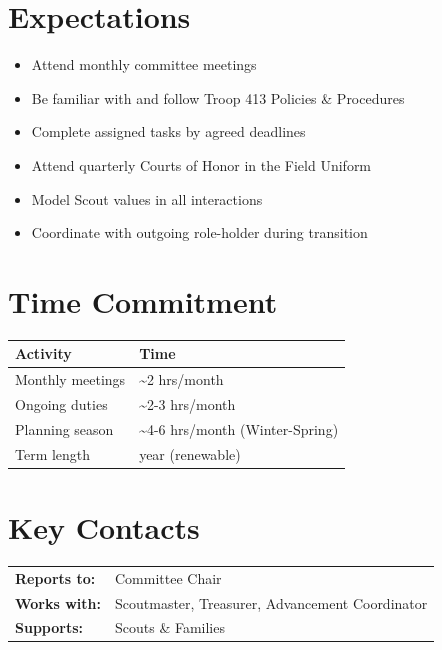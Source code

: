 \documentclass[11pt, letterpaper]{article}
\begin{document}
\hfill
\begin{minipage}[t]{0.48\linewidth}
\raggedright

\section{Expectations}
\begin{itemize}
  \item Attend monthly committee meetings
  \item Be familiar with and follow Troop 413 Policies \& Procedures
  \item Complete assigned tasks by agreed deadlines
  \item Attend quarterly Courts of Honor in the Field Uniform
  \item Model Scout values in all interactions
  \item Coordinate with outgoing role-holder during transition
\end{itemize}

\section{Time Commitment}
\begin{tabular}{@{}p{3.0cm} >{\raggedright\arraybackslash}p{3.8cm}@{}}
  \toprule
  \textbf{Activity} & \textbf{Time} \\
  \midrule
  Monthly meetings  & \textasciitilde{}2 hrs/month \\
  Ongoing duties    & \textasciitilde{}2-3 hrs/month \\
  Planning season   & \textasciitilde{}4-6 hrs/month (Winter-Spring) \\
  Term length       & 1 year (renewable) \\
  \bottomrule
\end{tabular}

\vspace{1em}

\section{Key Contacts}
\begin{tabular}{@{}p{2.6cm} >{\raggedright\arraybackslash}p{4.2cm}@{}}
  \textbf{Reports to:}  & Committee Chair \\
  \textbf{Works with:}  & Scoutmaster, Treasurer, Advancement Coordinator \\
  \textbf{Supports:}    & Scouts \& Families \\
\end{tabular}

\end{minipage}
\end{document}
